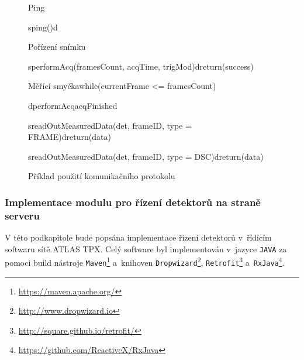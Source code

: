 \begin{figure}[t]
	\begin{center}
		\begin{sequencediagram}
			\begin{sdblock}{Ping}{}
				\begin{call}{s}{ping()}{d}{}
				\end{call}
			\end{sdblock}
			\begin{sdblock}{Pořízení snímku}{}
				\begin{call}{s}{performAcq(framesCount, acqTime, trigMod)}{d}{return(success)}	
				\end{call}
				\begin{sdblock}{Měřící smyčka}{while(currentFrame <= framesCount)}
					\begin{callself}{d}{performAcq}{acqFinished}
					\end{callself}
					\begin{call}{s}{readOutMeasuredData(det, frameID, type = FRAME)}{d}{return(data)}
					\end{call}
					\begin{call}{s}{readOutMeasuredData(det, frameID, type = DSC)}{d}{return(data)}
					\end{call}
				\end{sdblock}
			\end{sdblock}
		\end{sequencediagram}
		\caption{Příklad použití komunikačního protokolu}
		\label{fig:uml:com_priklad}
	\end{center}
\end{figure}


\subsubsection{Implementace modulu pro řízení detektorů na straně serveru}\label{atlas:cont:impl}
V této podkapitole bude popsána implementace řízení detektorů v~řídícím softwaru sítě ATLAS TPX. Celý software byl implementován v~jazyce \texttt{JAVA} za pomoci build nástroje \texttt{Maven}\footnote{\url{https://maven.apache.org/}} a~knihoven \texttt{Dropwizard}\footnote{\url{http://www.dropwizard.io}}, \texttt{Retrofit}\footnote{\url{http://square.github.io/retrofit/}} a~\texttt{RxJava}\footnote{\url{https://github.com/ReactiveX/RxJava}}.

